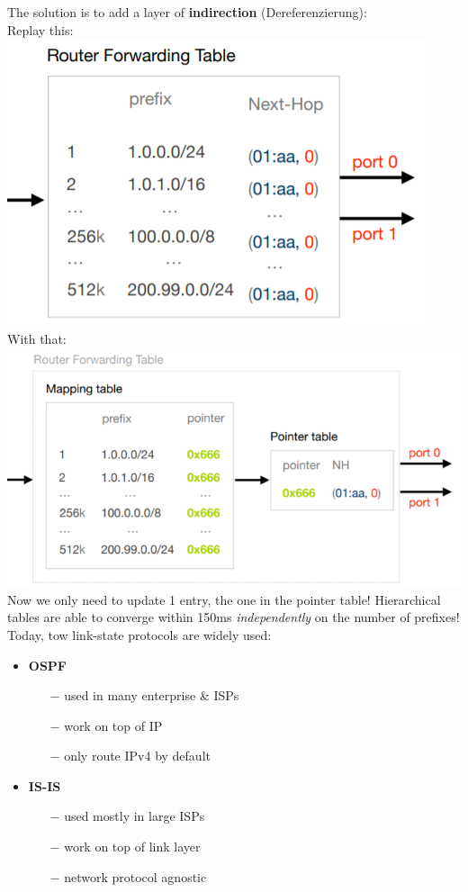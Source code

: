 \documentclass[a4paper, fontsize=8pt, landscape, DIV=1]{scrartcl}
\begin{document}
\begin{multicols*}{4}
   		The solution is to add a layer of \textbf{indirection} (Dereferenzierung):\\
   		Replay this:\\
   		\includegraphics[width=0.7\columnwidth]{images/Network_Layer/forward_table.png}\\
   		With that:\\
   		\includegraphics[width=\columnwidth]{images/Network_Layer/forward_table_pointer.png}
   		Now we only need to update 1 entry, the one in the pointer table! Hierarchical tables are able to converge within 150ms \textit{independently} on the number of prefixes!\\
   		Today, tow link-state protocols are widely used:
   		\begin{itemize}[noitemsep]
   			\item \textbf{OSPF}
   			\begin{itemize}
   				\item[$-$] used in many enterprise \& ISPs
   				\item[$-$] work on top of IP
   				\item[$-$] only route IPv4 by default
   			\end{itemize}
   			\item \textbf{IS-IS}
   			\begin{itemize}
   				\item[$-$] used mostly in large ISPs
   				\item[$-$] work on top of link layer
   				\item[$-$] network protocol agnostic
   			\end{itemize}
   		\end{itemize} 
		\par
		

\end{multicols*}
\end{document}
